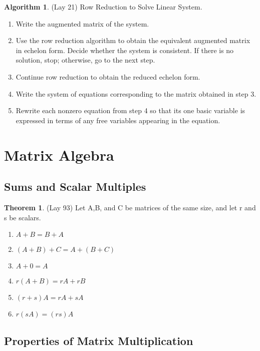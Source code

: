 \documentclass[12pt]{article}
\theoremstyle{definition}
\newtheorem{theorem}{Theorem}  %
\newtheorem{algorithm}{Algorithm}
\numberwithin{equation}{theorem}    %
\begin{document}
\begin{algorithm}(Lay 21) Row Reduction to Solve Linear System.
    \begin{enumerate}
        \item Write the augmented matrix of the system.
        \item Use the row reduction algorithm to obtain the equivalent augmented matrix in echelon form. Decide whether the system is consistent. If there is no solution, stop; otherwise, go to the next step.
        \item Continue row reduction to obtain the reduced echelon form.
        \item Write the system of equations corresponding to the matrix obtained in step 3.
        \item Rewrite each nonzero equation from step 4 so that its one basic variable is expressed in terms of any free variables appearing in the equation.
    \end{enumerate}
\end{algorithm}

\section{Matrix Algebra}

\subsection{Sums and Scalar Multiples}

\begin{theorem}(Lay 93)
    Let A,B, and C be matrices of the same size, and let r and s be scalars.

    \begin{enumerate}
        \item $A+B=B+A$
        \item $(A+B)+C = A+(B+C)$
        \item $A+0=A$
        \item $r(A+B)=rA+rB$
        \item $(r+s)A=rA+sA$
        \item $r(sA)=(rs)A$
    \end{enumerate}
\end{theorem}

\subsection{Properties of Matrix Multiplication}
\end{document}

